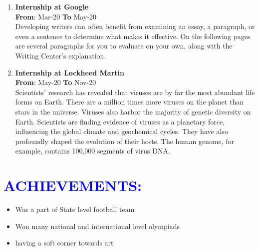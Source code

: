 \documentclass{article}
\begin{document}
\begin{multicols}{2}

\begin{enumerate}
	\item {\textbf{Internship at Google}}\\
	\hfill {\textbf{From}}: Mar-20 {\textbf{To}} May-20\\
	Developing writers can often benefit from examining an essay, a paragraph, or even a sentence to determine what makes it effective. On the following pages are several paragraphs for you to evaluate on your own, along with the Writing Center's explanation.
	\item {\textbf{Internship at Lockheed Martin}}\\
	\hfill {\textbf{From}}: May-20 {\textbf{To}} Nov-20\\
	 Scientists' research has revealed that viruses are by far the most abundant life forms on Earth. There are a million times more viruses on the planet than stars in the universe. Viruses also harbor the majority of genetic diversity on Earth. Scientists are finding evidence of viruses as a planetary force, influencing the global climate and geochemical cycles. They have also profoundly shaped the evolution of their hosts. The human genome, for example, contains 100,000 segments of virus DNA.
\end{enumerate}

\vspace{5pt}

\section*{\large{\textcolor{blue}{\uppercase{achievements:}}}}

\begin{flushleft}
\begin{itemize}[noitemsep,nolistsep]
	\item Was a part of State level football team
	\item Won many national and international level olympiads
	\item having a soft corner towards art
\end{itemize}
\end{flushleft}
\vspace{5pt}

\end{multicols}
\end{document}
